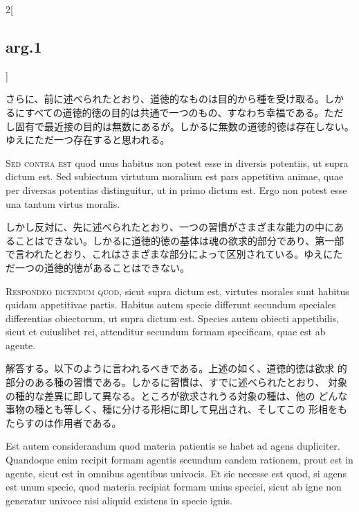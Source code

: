 \documentclass[paper=a4paper,fontsize=10pt,jafontsize=9pt,titlepage]{jlreq}
\begin{document}
\begin{paracol}{2}[\subsection{arg.1}]
\switchcolumn

さらに、前に述べられたとおり、道徳的なものは目的から種を受け取る。しか
るにすべての道徳的徳の目的は共通で一つのもの、すなわち幸福である。ただ
し固有で最近接の目的は無数にあるが。しかるに無数の道徳的徳は存在しない。
ゆえにただ一つ存在すると思われる。

\switchcolumn*[\subsection{s.c.}]

{\scshape Sed contra est} quod unus habitus non potest esse in
diversis potentiis, ut supra dictum est. Sed subiectum virtutum
moralium est pars appetitiva animae, quae per diversas potentias
distinguitur, ut in primo dictum est. Ergo non potest esse una tantum
virtus moralis.

\switchcolumn

しかし反対に、先に述べられたとおり、一つの習慣がさまざまな能力の中にあ
ることはできない。しかるに道徳的徳の基体は魂の欲求的部分であり、第一部
で言われたとおり、これはさまざまな部分によって区別されている。ゆえにた
だ一つの道徳的徳があることはできない。


{\scshape Respondeo dicendum quod}, sicut supra dictum est, virtutes
 morales sunt habitus quidam appetitivae partis. Habitus autem specie
 differunt secundum speciales differentias obiectorum, ut supra dictum
 est. Species autem obiecti appetibilis, sicut et cuiuslibet rei,
 attenditur secundum formam specificam, quae est ab agente.

\switchcolumn

解答する。以下のように言われるべきである。上述の如く、道徳的徳は欲求
 的部分のある種の習慣である。しかるに習慣は、すでに述べられたとおり、
 対象の種的な差異に即して異なる。ところが欲求されうる対象の種は、他の
 どんな事物の種とも等しく、種に分ける形相に即して見出され、そしてこの
 形相をもたらすのは作用者である。

\switchcolumn*

Est autem considerandum quod materia patientis se habet ad agens
 dupliciter. Quandoque enim recipit formam agentis secundum eandem
 rationem, prout est in agente, sicut est in omnibus agentibus
 univocis. Et sic necesse est quod, si agens est unum specie, quod
 materia recipiat formam unius speciei, sicut ab igne non generatur
 univoce nisi aliquid existens in specie ignis.


\end{paracol}
\end{document}
